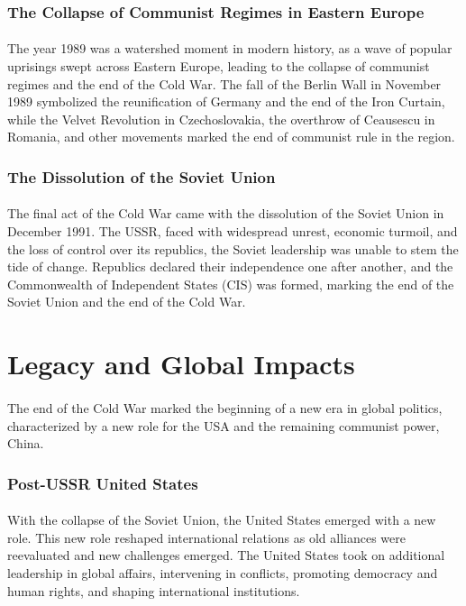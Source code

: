 \documentclass[a4paper,12pt]{book}
\begin{document}
\subsubsection*{The Collapse of Communist Regimes in Eastern Europe}
\paragraph{}
The year 1989 was a watershed moment in modern history, as a wave of popular uprisings swept across Eastern Europe, leading to the collapse of communist regimes and the end of the Cold War. The fall of the Berlin Wall in November 1989 symbolized the reunification of Germany and the end of the Iron Curtain, while the Velvet Revolution in Czechoslovakia, the overthrow of Ceausescu in Romania, and other movements marked the end of communist rule in the region. 

\subsubsection*{The Dissolution of the Soviet Union}
\paragraph{}
The final act of the Cold War came with the dissolution of the Soviet Union in December 1991. The USSR, faced with widespread unrest, economic turmoil, and the loss of control over its republics, the Soviet leadership was unable to stem the tide of change. Republics declared their independence one after another, and the Commonwealth of Independent States (CIS) was formed, marking the end of the Soviet Union and the end of the Cold War. 

\section*{Legacy and Global Impacts}
\paragraph{}
The end of the Cold War marked the beginning of a new era in global politics, characterized by a new role for the USA and the remaining communist power, China. 

\subsubsection*{Post-USSR United States}
\paragraph{}
With the collapse of the Soviet Union, the United States emerged with a new role. This new role reshaped international relations as old alliances were reevaluated and new challenges emerged. The United States took on additional leadership in global affairs, intervening in conflicts, promoting democracy and human rights, and shaping international institutions. 
\end{document}
